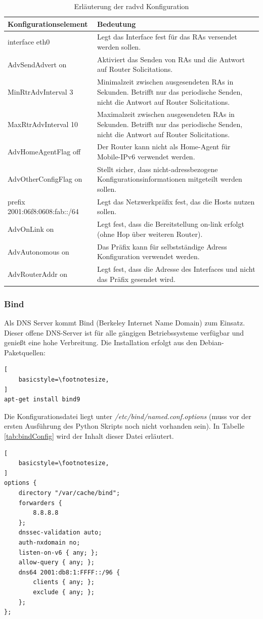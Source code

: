 \begin{table}
	\centering
		\begin{tabular}{lp{9cm}}
			Konfigurationselement & Bedeutung \\ \hline
			interface eth0 & Legt das Interface fest für das RAs versendet werden sollen. \\
			AdvSendAdvert on & Aktiviert das Senden von RAs und die Antwort auf Router Solicitations. \\
			MinRtrAdvInterval 3 & Minimalzeit zwischen ausgesendeten RAs in Sekunden. Betrifft nur das periodische Senden, nicht die Antwort auf Router Solicitations. \\
			MaxRtrAdvInterval 10 & Maximalzeit zwischen ausgesendeten RAs in Sekunden. Betrifft nur das periodische Senden, nicht die Antwort auf Router Solicitations. \\
			AdvHomeAgentFlag off & Der Router kann nicht als Home-Agent für Mobile-IPv6 verwendet werden. \\
			AdvOtherConfigFlag on & Stellt sicher, dass nicht-adressbezogene Konfigurationsinformationen mitgeteilt werden sollen. \\
			prefix 2001:06f8:0608:fab::/64 & Legt das Netzwerkpräfix fest, das die Hosts nutzen sollen. \\
			AdvOnLink on & Legt fest, dass die Bereitstellung on-link erfolgt (ohne Hop über weiteren Router). \\
			AdvAutonomous on & Das Präfix kann für selbstständige Adress Konfiguration verwendet werden. \\
			AdvRouterAddr on & Legt fest, dass die Adresse des Interfaces und nicht das Präfix gesendet wird.  \\
		\end{tabular}
	\caption{Erläuterung der radvd Konfiguration}
	\label{tab:radvdConfig}
\end{table}
\FloatBarrier
\subsubsection*{Bind}
Als DNS Server kommt Bind (Berkeley Internet Name Domain) zum Einsatz. Dieser offene DNS-Server ist für alle gängigen Betriebssysteme verfügbar und genießt eine hohe Verbreitung. Die Installation erfolgt aus den Debian-Paketquellen:
\lstset{language=bash}
\begin{lstlisting}[
	basicstyle=\footnotesize,
]
apt-get install bind9
\end{lstlisting}

Die Konfigurationsdatei liegt unter \textit{/etc/bind/named.conf.options} (muss vor der ersten Ausführung des Python Skripts noch nicht vorhanden sein). In Tabelle \ref{tab:bindConfig} wird der Inhalt dieser Datei erläutert.
\begin{lstlisting}[
	basicstyle=\footnotesize,
]
options {
	directory "/var/cache/bind";
	forwarders {
		8.8.8.8
	};
	dnssec-validation auto;
	auth-nxdomain no;
	listen-on-v6 { any; };
	allow-query { any; };
	dns64 2001:db8:1:FFFF::/96 {
		clients { any; };
		exclude { any; };
	};
};
\end{lstlisting}

